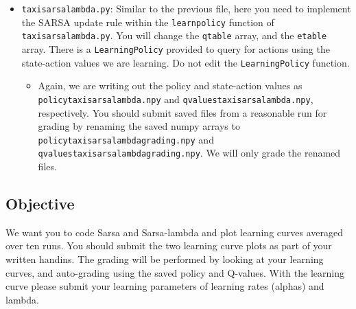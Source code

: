 \documentclass[12pt]{article}
\begin{document}
\begin{itemize}
\item \texttt{taxi\textunderscore sarsa\textunderscore lambda.py}: Similar to the previous file, here you need to implement the SARSA update rule within the \texttt{learn\textunderscore policy} function of \texttt{taxi\textunderscore sarsa\textunderscore lambda.py}. You will change the \texttt{qtable} array, and the \texttt{etable} array. There is a \texttt{LearningPolicy} provided to query for actions using the state-action values we are learning. Do not edit the \texttt{LearningPolicy} function. 
\begin{itemize}
\item Again, we are writing out the policy and state-action values as \\ \texttt{policy\textunderscore taxi\textunderscore sarsa\textunderscore lambda.npy} and \texttt{qvalues\textunderscore taxi\textunderscore sarsa\textunderscore lambda.npy}, respectively. You should submit saved files from a reasonable run for grading by renaming the saved numpy arrays to  \texttt{policy\textunderscore taxi\textunderscore sarsa\textunderscore lambda\textunderscore grading.npy} and   \\ \texttt{qvalues\textunderscore taxi\textunderscore sarsa\textunderscore lambda\textunderscore grading.npy}. 
We will only grade the renamed files.
\end{itemize}
\end{itemize}

\subsection{Objective}
We want you to code Sarsa and Sarsa-lambda and plot learning curves averaged over ten runs.
You should submit the two learning curve plots as part of your written handins.
The grading will be performed by looking at your learning curves, and auto-grading using the saved policy and Q-values.
With the learning curve please submit your learning parameters of learning rates (alphas) and lambda.
\end{document}
